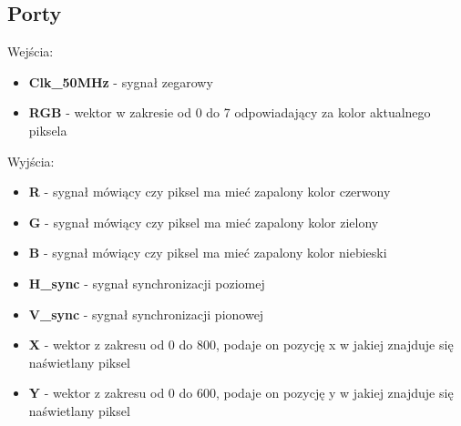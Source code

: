 \documentclass[a4paper]{report}
\begin{document}
		\subsection{Porty}
			{\Large Wejścia:}
			\begin{itemize}	 
				\item \textbf{Clk\_50MHz} - sygnał zegarowy
				\item \textbf{RGB} - wektor w zakresie od 0 do 7 odpowiadający za kolor aktualnego piksela
			\end{itemize}
			{\Large Wyjścia:}
			\begin{itemize} 
				\item \textbf{R} - sygnał mówiący czy piksel ma mieć zapalony kolor czerwony
				\item \textbf{G} - sygnał mówiący czy piksel ma mieć zapalony kolor zielony
				\item \textbf{B} - sygnał mówiący czy piksel ma mieć zapalony kolor niebieski
				\item \textbf{H\_sync} - sygnał synchronizacji poziomej
				\item \textbf{V\_sync} - sygnał synchronizacji pionowej
				\item \textbf{X} - wektor z zakresu od 0 do 800, podaje on pozycję x w jakiej znajduje się naświetlany piksel
				\item \textbf{Y} - wektor z zakresu od 0 do 600, podaje on pozycję y w jakiej znajduje się naświetlany piksel
			\end{itemize}
			
\end{document}
